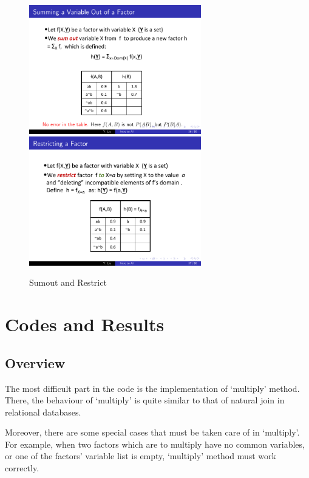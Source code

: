 \documentclass[a4paper, 11pt]{article}
\begin{document}
\begin{figure}[ht]
\centering
\includegraphics[width=7.5cm]{Pic/sumout}
\qquad
\includegraphics[width=7.5cm]{Pic/restrict}
\caption{Sumout and Restrict}
\label{Fig:sumout_restrict}
\end{figure}



\section{Codes and Results}
\subsection{Overview}
The most difficult part in the code is the implementation of `multiply' method. There, the behaviour of `multiply' is quite similar to that of natural join in relational databases.

Moreover, there are some special cases that must be taken care of in `multiply'. For example, when two factors which are to multiply have no common variables, or one of the factors' variable list is empty, `multiply' method must work correctly.
\end{document}

